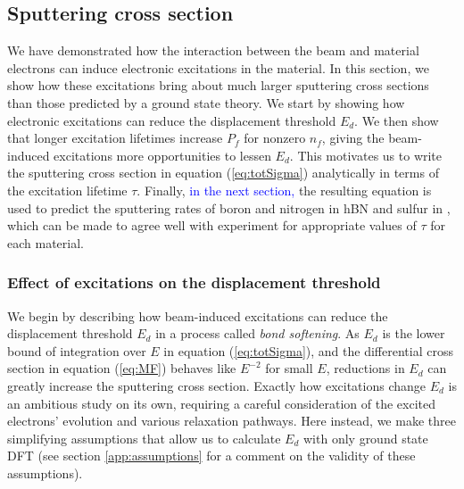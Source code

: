 \documentclass[twoside,twocolumn,9pt]{article}
\begin{document}
\subsection{Sputtering cross section}
\label{sec:sputtering}

We have demonstrated how the interaction between the beam and material
electrons can induce electronic excitations in the material.
In this section, we show how these excitations bring about much larger
sputtering cross sections than those predicted by a ground state theory.
We start by showing how electronic excitations can reduce the displacement
threshold $E_d$.
We then show that longer excitation lifetimes increase $P_f$ for nonzero $n_f$,
giving the beam-induced excitations more opportunities to lessen $E_d$.
This motivates us to write the sputtering cross section in equation
(\ref{eq:totSigma}) analytically in terms of the excitation lifetime $\tau$.
Finally, \textcolor{blue}{in the next section,} the resulting equation is used
to predict the sputtering rates of boron and nitrogen in hBN and sulfur in
, which can be made to agree well with experiment for appropriate
values of $\tau$ for each material.

\subsubsection{Effect of excitations on the displacement threshold}
\label{sec:assumptions}

We begin by describing how beam-induced excitations can reduce the
displacement threshold $E_d$ in a process called \textit{bond softening}.
As $E_d$ is the lower bound of integration over $E$ in equation
(\ref{eq:totSigma}), and the differential cross section in equation
(\ref{eq:MF}) behaves like $E^{-2}$ for small $E$, reductions in $E_d$ can
greatly increase the sputtering cross section.
Exactly how excitations change $E_d$ is an ambitious study on its own,
requiring a careful consideration of the excited electrons' evolution and
various relaxation pathways.\cite{Lingerfelt2019a}
Here instead, we make three simplifying assumptions that allow us to calculate
$E_d$ with only ground state DFT (see section \ref{app:assumptions} for a
comment on the validity of these assumptions).
\end{document}
